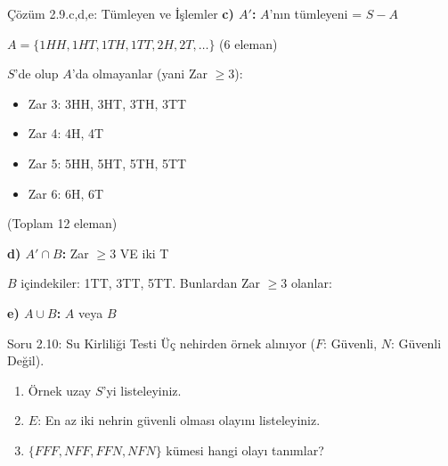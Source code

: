 \documentclass[light]{lutbeamer}
\begin{document}
\begin{frame}{Çözüm 2.9.c,d,e: Tümleyen ve İşlemler}
    \color{blue}
    \textbf{c) $A'$:} $A$'nın tümleyeni = $S - A$
    
    $A = \{1HH, 1HT, 1TH, 1TT, 2H, 2T, \ldots\}$ (6 eleman)
    
    $S$'de olup $A$'da olmayanlar (yani Zar $\geq 3$):
    \begin{itemize}
        \item Zar 3: 3HH, 3HT, 3TH, 3TT
        \item Zar 4: 4H, 4T
        \item Zar 5: 5HH, 5HT, 5TH, 5TT
        \item Zar 6: 6H, 6T
    \end{itemize}
    (Toplam 12 eleman)
    
    \vspace{0.2cm}
    \textbf{d) $A' \cap B$:} Zar $\geq 3$ VE iki T
    
    $B$ içindekiler: 1TT, 3TT, 5TT. Bunlardan Zar $\geq 3$ olanlar:
    \begin{center}
    \end{center}
    
    \vspace{0.2cm}
    \textbf{e) $A \cup B$:} $A$ veya $B$
    
    \begin{center}
    \end{center}
\end{frame}

\begin{frame}{Soru 2.10: Su Kirliliği Testi}
    Üç nehirden örnek alınıyor ($F$: Güvenli, $N$: Güvenli Değil).
    \begin{enumerate}
        \item Örnek uzay $S$'yi listeleyiniz.
        \item $E$: En az iki nehrin güvenli olması olayını listeleyiniz.
        \item $\{ FFF, NFF, FFN, NFN \}$ kümesi hangi olayı tanımlar?
    \end{enumerate}
\end{frame}
\end{document}
